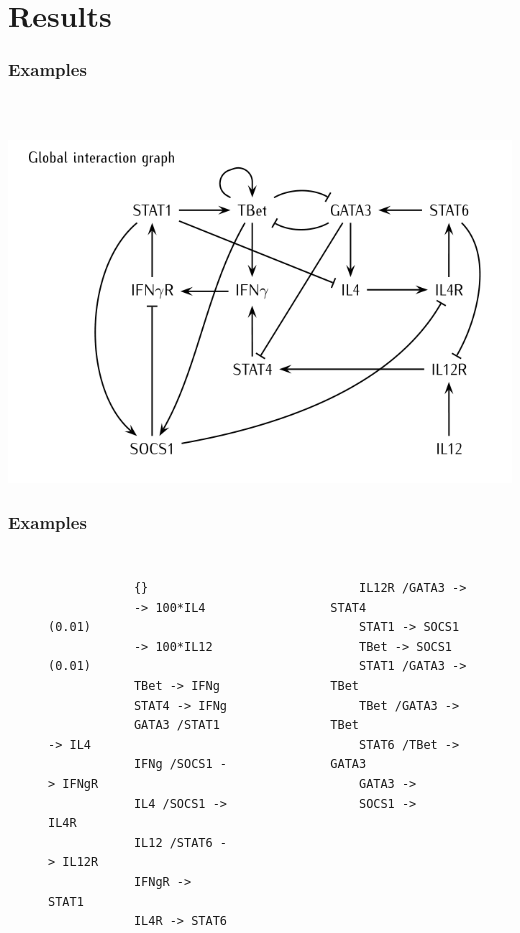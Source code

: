 \documentclass{beamer}
\begin{document}
\section{Results}
\begin{frame}
	\frametitle{Examples}
	\begin{columns}
	\begin{figure}[htbp]
		
	\end{figure}%
	\begin{figure}[htbp]
		
	\end{figure}
\end{columns}
\end{frame}
\begin{frame}
	\includegraphics[height=0.8\textheight]{th_net}
\end{frame}
\begin{frame}[fragile=singleslide]
	\frametitle{Examples}
	\begin{columns}
		\begin{figure}[htbp]
			\begin{verbatim}
			{}
			-> 100*IL4 (0.01)
			-> 100*IL12 (0.01)
			TBet -> IFNg
			STAT4 -> IFNg
			GATA3 /STAT1 -> IL4
			IFNg /SOCS1 -> IFNgR
			IL4 /SOCS1 -> IL4R
			IL12 /STAT6 -> IL12R
			IFNgR -> STAT1
			IL4R -> STAT6
		\end{verbatim}
				\end{figure}
\begin{figure}[htbp]
	\begin{verbatim}
	IL12R /GATA3 -> STAT4
	STAT1 -> SOCS1
	TBet -> SOCS1
	STAT1 /GATA3 -> TBet
	TBet /GATA3 -> TBet
	STAT6 /TBet -> GATA3
	GATA3 ->
	SOCS1 ->
	\end{verbatim}
\end{figure}
	\end{columns}
\end{frame}
\end{document}
